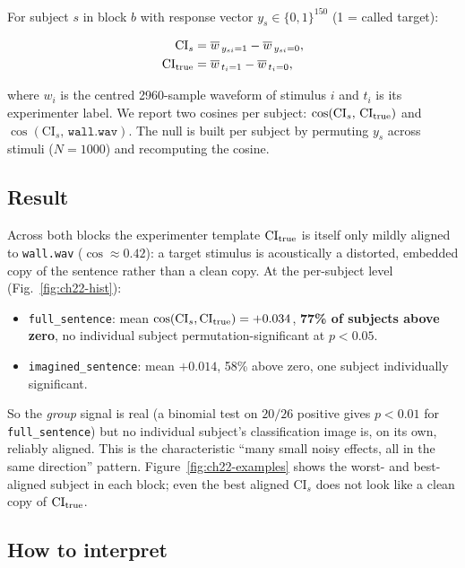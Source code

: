 \documentclass[11pt]{article}
\begin{document}
For subject $s$ in block $b$ with response vector
$y_s \in \{0,1\}^{150}$ (1 = called target):

\begin{align*}
\mathrm{CI}_s     &= \overline{w}_{\,y_{si}=1}
                   - \overline{w}_{\,y_{si}=0}, \\
\mathrm{CI}_{\rm true} &= \overline{w}_{\,t_{i}=1}
                          - \overline{w}_{\,t_{i}=0},
\end{align*}

where $w_i$ is the centred 2960-sample waveform of stimulus $i$ and
$t_i$ is its experimenter label. We report two cosines per subject:
$\cos(\mathrm{CI}_s,\,\mathrm{CI}_{\rm true})$ and
$\cos(\mathrm{CI}_s,\,\texttt{wall.wav})$. The null is built per subject
by permuting $y_s$ across stimuli ($N=1000$) and recomputing the cosine.

\subsection{Result}

Across both blocks the experimenter template $\mathrm{CI}_{\rm true}$ is
itself only mildly aligned to \texttt{wall.wav}
($\cos\!\approx\!0.42$): a target stimulus is acoustically a distorted,
embedded copy of the sentence rather than a clean copy.
At the per-subject level (Fig.~\ref{fig:ch22-hist}):

\begin{itemize}
\item \texttt{full\_sentence}: mean
      $\cos(\mathrm{CI}_s,\mathrm{CI}_{\rm true}) = +0.034$,
      \textbf{77\% of subjects above zero}, no individual subject
      permutation-significant at $p<0.05$.
\item \texttt{imagined\_sentence}: mean $+0.014$, 58\% above zero, one
      subject individually significant.
\end{itemize}

So the \emph{group} signal is real (a binomial test on $20/26$ positive
gives $p<0.01$ for \texttt{full\_sentence}) but no individual subject's
classification image is, on its own, reliably aligned. This is the
characteristic ``many small noisy effects, all in the same direction''
pattern. Figure~\ref{fig:ch22-examples} shows the worst- and
best-aligned subject in each block; even the best aligned $\mathrm{CI}_s$
does not look like a clean copy of $\mathrm{CI}_{\rm true}$.

\subsection{How to interpret}
\end{document}
